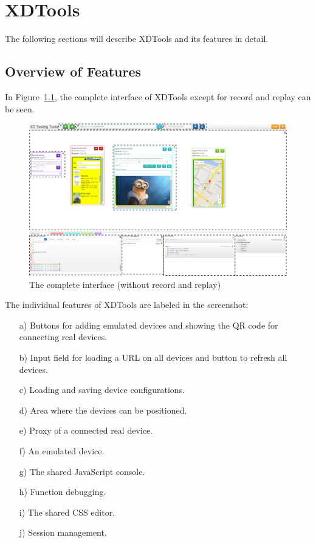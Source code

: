 \chapter{XDTools}

The following sections will describe XDTools and its features in detail.

\section{Overview of Features}

In Figure~\ref{fig:complete}, the complete interface of XDTools except for record and replay can be seen.

\begin{figure}[H]
  \centering
    \includegraphics[width=1.0\textwidth]{images/screenshots/complete_labeled.png}
	\caption[Screenshot: Complete Interface]{The complete interface (without record and replay)}
	\label{fig:complete}
\end{figure}

The individual features of XDTools are labeled in the screenshot:
\begin{itemize}
	\item [a)] Buttons for adding emulated devices and showing the QR code for connecting real devices.
	\item [b)] Input field for loading a URL on all devices and button to refresh all devices.
	\item [c)] Loading and saving device configurations.
	\item [d)] Area where the devices can be positioned.
	\item [e)] Proxy of a connected real device.
	\item [f)] An emulated device.
	\item [g)] The shared JavaScript console.
	\item [h)] Function debugging.
	\item [i)] The shared CSS editor.
	\item [j)] Session management.
\end{itemize}

